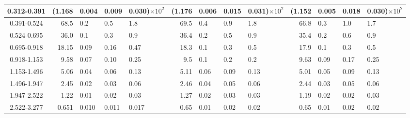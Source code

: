 \begin{table}[!htbp]
{\begin{tabular}{ | c | r@{$\pm$}l@{$\pm$}l@{$\pm$}l | r@{$\pm$}l@{$\pm$}l@{$\pm$}l | r@{$\pm$}l@{$\pm$}l@{$\pm$}l |}
0.312-0.391 & (1.168&0.004&0.009&0.030)$\times 10^{2}$ & (1.176&0.006&0.015&0.031)$\times 10^{2}$ & (1.152&0.005&0.018&0.030)$\times 10^{2}$ \\ \hline
0.391-0.524 & 68.5&0.2&0.5&1.8 & 69.5&0.4&0.9&1.8 & 66.8&0.3&1.0&1.7 \\ \hline
0.524-0.695 & 36.0&0.1&0.3&0.9 & 36.4&0.2&0.5&0.9 & 35.4&0.2&0.6&0.9 \\ \hline
0.695-0.918 & 18.15&0.09&0.16&0.47 & 18.3&0.1&0.3&0.5 & 17.9&0.1&0.3&0.5 \\ \hline
0.918-1.153 & 9.58&0.07&0.10&0.25 & 9.5&0.1&0.2&0.2 & 9.63&0.09&0.17&0.25 \\ \hline
1.153-1.496 & 5.06&0.04&0.06&0.13 & 5.11&0.06&0.09&0.13 & 5.01&0.05&0.09&0.13 \\ \hline
1.496-1.947 & 2.45&0.02&0.03&0.06 & 2.46&0.04&0.05&0.06 & 2.44&0.03&0.05&0.06 \\ \hline
1.947-2.522 & 1.22&0.01&0.02&0.03 & 1.27&0.02&0.03&0.03 & 1.19&0.02&0.02&0.03 \\ \hline
2.522-3.277 & 0.651&0.010&0.011&0.017 & 0.65&0.01&0.02&0.02 & 0.65&0.01&0.02&0.02 \\ \hline
\end{tabular}}
\end{table}
\clearpage
